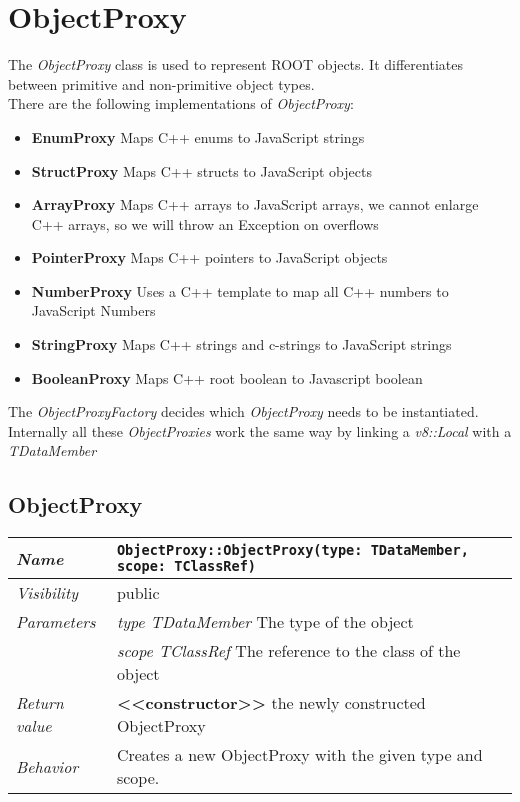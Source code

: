 \chapter{ObjectProxy}
The \textit{ObjectProxy} class is used to represent ROOT objects. It differentiates between primitive and non-primitive object types.\\
There are the following implementations of \textit{ObjectProxy}:
\begin{itemize}
\item \textbf{EnumProxy} Maps C++ enums to JavaScript strings
\item \textbf{StructProxy} Maps C++ structs to JavaScript objects
\item \textbf{ArrayProxy} Maps C++ arrays to JavaScript arrays, we cannot enlarge C++ arrays, so we will throw an Exception on overflows
\item \textbf{PointerProxy} Maps C++ pointers to JavaScript objects
\item \textbf{NumberProxy} Uses a C++ template to map all C++ numbers to JavaScript Numbers
\item \textbf{StringProxy} Maps C++ strings and c-strings to JavaScript strings
\item \textbf{BooleanProxy} Maps C++ root boolean to Javascript boolean
\end{itemize}
The \textit{ObjectProxyFactory} decides which \textit{ObjectProxy} needs to be instantiated.
Internally all these \textit{ObjectProxies} work the same way by linking a \textit{v8::Local} with a \textit{TDataMember}
\section{ObjectProxy}
\begin{longtable}{p{3cm} @{\hskip 1cm} p{12cm}}
 \hline
\textit{Name} & \texttt{ObjectProxy::ObjectProxy(type: TDataMember, scope: TClassRef)}\\
\hline
 \textit{Visibility} & public\\
\hline
\textit{Parameters} & \textit{type TDataMember} The type of the object \\ & \textit{scope TClassRef} The reference to the class of the object \\
\hline
\textit{Return value} & \textbf{<<constructor>>} the newly constructed ObjectProxy\\
  \hline
  \textit{Behavior} & Creates a new ObjectProxy with the given type and scope.\\
\hline
\end{longtable} \pagebreak
